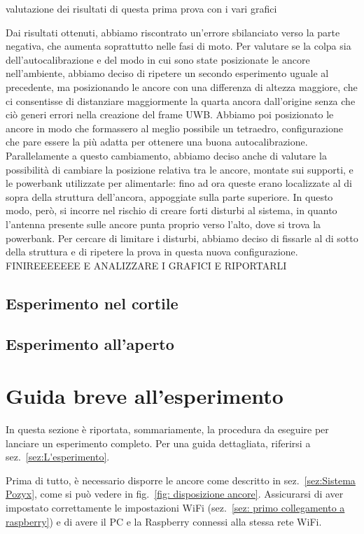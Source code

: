 valutazione dei risultati di questa prima prova con i vari grafici

Dai risultati ottenuti, abbiamo riscontrato un'errore sbilanciato verso la parte negativa, che aumenta soprattutto nelle fasi di moto. Per valutare se la colpa sia dell'autocalibrazione e del modo in cui sono state posizionate le ancore nell'ambiente, abbiamo deciso di ripetere un secondo esperimento uguale al precedente, ma posizionando le ancore con una differenza di altezza maggiore, che ci consentisse di distanziare maggiormente la quarta ancora dall'origine senza che ciò generi errori nella creazione del frame UWB. Abbiamo poi posizionato le ancore in modo che formassero al meglio possibile un tetraedro, configurazione che pare essere la più adatta per ottenere una buona autocalibrazione.
Parallelamente a questo cambiamento, abbiamo deciso anche di valutare la possibilità di cambiare la posizione relativa tra le ancore, montate sui supporti, e le powerbank utilizzate per alimentarle: fino ad ora queste erano localizzate al di sopra della struttura dell'ancora, appoggiate sulla parte superiore. In questo modo, però, si incorre nel rischio di creare forti disturbi al sistema, in quanto l'antenna presente sulle ancore punta proprio verso l'alto, dove si trova la powerbank. Per cercare di limitare i disturbi, abbiamo deciso di fissarle al di sotto della struttura e di ripetere la prova in questa nuova configurazione.
FINIREEEEEEE E ANALIZZARE I GRAFICI E RIPORTARLI 
\subsection{Esperimento nel cortile}

\subsection{Esperimento all'aperto}



\newpage
\section{Guida breve all'esperimento}
\label{sez: Guida breve all'esperimento}
In questa sezione è riportata, sommariamente, la procedura da eseguire per lanciare un esperimento completo. Per una guida dettagliata, riferirsi a sez.~\ref{sez:L'esperimento}. 

Prima di tutto, è necessario disporre le ancore come descritto in sez.~\ref{sez:Sistema Pozyx}, come si può vedere in fig.~\ref{fig: disposizione ancore}. Assicurarsi di aver impostato correttamente le impostazioni WiFi (sez.~\ref{sez: primo collegamento a raspberry}) e di avere il PC e la Raspberry connessi alla stessa rete WiFi.


